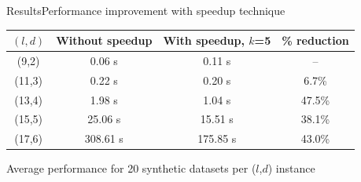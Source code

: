 \documentclass[pdf,xcolor={dvipsnames}]{beamer}
\begin{document}
	\begin{frame}{Results}{Performance improvement with speedup technique}
		\begin{table}[h] %
			\small
			\renewcommand{\arraystretch}{1.3}
			\label{tbl:speedup_blockmasking}
			\centering
			\begin{tabular}{|c|c|c|c|}
			\hline 
			\bfseries\boldmath $(l,d)$ & \bfseries Without speedup & \bfseries With speedup, $k$=5 & \bfseries \% reduction\\
			\hline
			 (9,2) &   0.06 s &    0.11 s &     --  \\
			(11,3) &   0.22 s &    0.20 s &    6.7\%\\
			(13,4) &   1.98 s &    1.04 s &   47.5\%\\
			(15,5) &  25.06 s &   15.51 s &   38.1\%\\
			(17,6) & 308.61 s &  175.85 s &   43.0\%\\
			\hline\end{tabular}
			\end{table}

		{\centering \footnotesize Average performance for 20 synthetic datasets per ($l$,$d$) instance \\}
		\end{frame}
\end{document}
